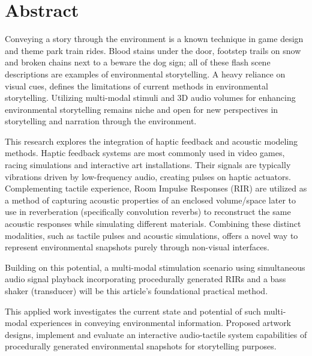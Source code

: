 \chapter*{Abstract}
    Conveying a story through the environment is a known technique in game design and theme park train rides\cite{Liminal_Space_Between_Embedded_and_Emergent_Narrative}. Blood stains under the door, footstep trails on snow and broken chains next to a beware the dog sign; all of these flash scene descriptions are examples of environmental storytelling. A heavy reliance on visual cues, defines the limitations of current methods in environmental storytelling. Utilizing multi-modal stimuli and 3D audio volumes for enhancing environmental storytelling remains niche and open for new perspectives in storytelling and narration through the environment.\par

    This research explores the integration of haptic feedback and acoustic modeling methods. Haptic feedback systems are most commonly used in video games, racing simulations and interactive art installations. Their signals are typically vibrations driven by low-frequency audio, creating pulses on haptic actuators. Complementing tactile experience, Room Impulse Responses (RIR) are utilized as a method of capturing acoustic properties of an enclosed volume/space\cite{Room_Acoustics} later to use in reverberation (specifically convolution reverbs) to reconstruct the same acoustic responses while simulating different materials. Combining these distinct modalities, such as tactile pulses and acoustic simulations, offers a novel way to represent environmental snapshots purely through non-visual interfaces.\par
    
    Building on this potential, a multi-modal stimulation scenario using simultaneous audio signal playback incorporating procedurally generated RIRs and a bass shaker (transducer) will be this article's foundational practical method. \par
    
    This applied work investigates the current state and potential of such multi-modal experiences in conveying environmental information. Proposed artwork designs, implement and evaluate an interactive audio-tactile system capabilities of procedurally generated environmental snapshots for storytelling purposes.\par